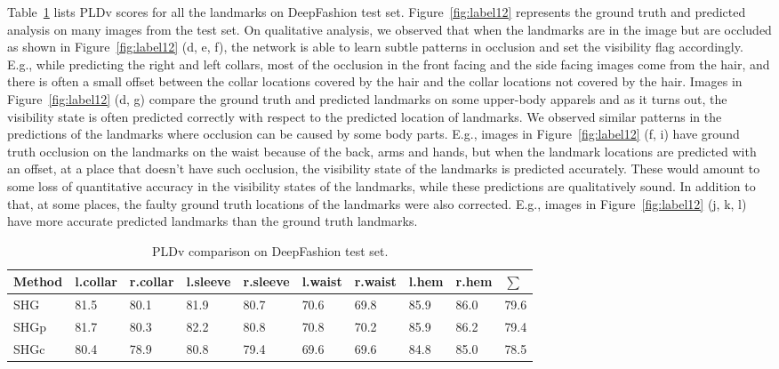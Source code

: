 \documentclass[conference]{IEEEtran}
\begin{document}
Table~\ref{table:table14} lists  PLDv scores for all the landmarks on DeepFashion test set. 
Figure~\ref{fig:label12} represents the ground truth and predicted analysis on many images from the test set. On qualitative analysis, we observed that when the landmarks are in the image but are occluded as shown in Figure~\ref{fig:label12} (d, e, f), the network is able to learn subtle patterns in occlusion and set the visibility flag accordingly. E.g., while predicting the right and left collars, most of the occlusion in the front facing and the side facing images come from the hair, and there is often a small offset between the collar locations covered by the hair and the collar locations not covered by the hair.  Images in Figure~\ref{fig:label12} (d, g) compare the ground truth and predicted landmarks on some upper-body apparels and as it turns out, the visibility state is often predicted correctly with respect to the predicted location of landmarks. We observed similar patterns in the predictions of the landmarks where occlusion can be caused by some body parts. E.g., images in Figure~\ref{fig:label12} (f, i) have ground truth occlusion on the landmarks on the waist because of the back, arms and hands, but when the landmark locations are predicted with an offset, at a place that doesn't have such occlusion, the visibility state of the landmarks is predicted accurately. These would amount to some loss of quantitative accuracy in the visibility states of the landmarks, while these predictions are qualitatively sound. In addition to that, at some places, the faulty ground truth locations of the landmarks were also corrected. E.g., images in Figure~\ref{fig:label12} (j, k, l) have more accurate predicted landmarks than the ground truth landmarks.

\begin{table}[ht]
    \centering
     \tiny
    \caption{PLDv comparison on DeepFashion test set.}
    \begin{tabular}{|p{0.5cm}|p{0.5cm}|p{0.5cm}|p{0.5cm}|p{0.5cm}|p{0.4cm}|p{0.4cm}|p{0.4cm}|p{0.4cm}|p{0.3cm}|}
    \hline
    \textbf{Method} & \textbf{l.collar} & \textbf{r.collar} & \textbf{l.sleeve} & \textbf{r.sleeve} &\textbf{l.waist} &\textbf{r.waist} &\textbf{l.hem}& \textbf{r.hem} & \textbf{$\sum$} \\[4pt]
    \hline
    SHG  & 81.5 & 80.1 & 81.9 & 80.7 & 70.6 & 69.8 & 85.9 & 86.0  & 79.6 \\[3pt]
    \hline
    SHGp  & 81.7 & 80.3 & 82.2 & 80.8 & 70.8 & 70.2 & 85.9 & 86.2  & 79.4 \\[3pt]
    \hline
    SHGc& 80.4&	78.9&	80.8 &	79.4 &	69.6 &	69.6 &	84.8 &	85.0 &	78.5\\[3pt]
    \hline
    \end{tabular}
    \label{table:table14}
\end{table}
\end{document}
